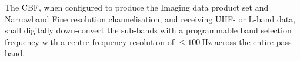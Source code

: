 The CBF, when configured to produce the Imaging data product set and Narrowband
Fine resolution channelisation, and receiving UHF- or L-band data, shall digitally
down-convert the sub-bands with a programmable band selection frequency with a
centre frequency resolution of $\le \SI{100}{\hertz}$ across the entire pass band.
